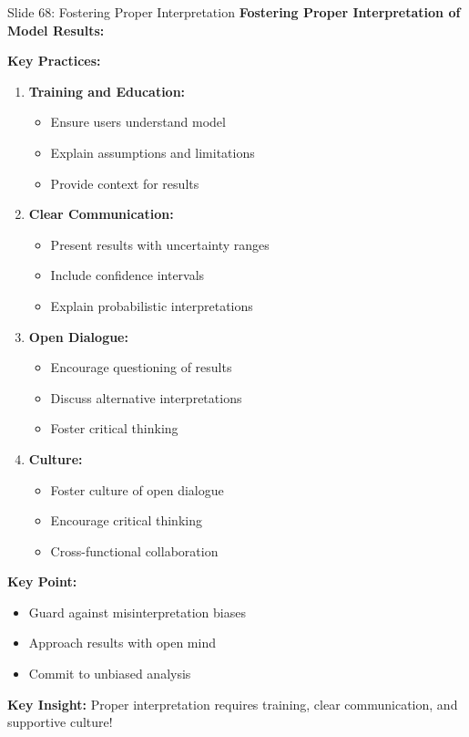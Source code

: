 \documentclass[8pt]{beamer}
\begin{document}
	\begin{frame}{Slide 68: Fostering Proper Interpretation}
		\fontsize{6.5}{7.5}\selectfont
		\textbf{Fostering Proper Interpretation of Model Results:}
		
		\vspace{0.1cm}
		\textbf{Key Practices:}
		\begin{enumerate}
			\item \textbf{Training and Education:}
			\begin{itemize}
				\item Ensure users understand model
				\item Explain assumptions and limitations
				\item Provide context for results
			\end{itemize}
			\item \textbf{Clear Communication:}
			\begin{itemize}
				\item Present results with uncertainty ranges
				\item Include confidence intervals
				\item Explain probabilistic interpretations
			\end{itemize}
			\item \textbf{Open Dialogue:}
			\begin{itemize}
				\item Encourage questioning of results
				\item Discuss alternative interpretations
				\item Foster critical thinking
			\end{itemize}
			\item \textbf{Culture:}
			\begin{itemize}
				\item Foster culture of open dialogue
				\item Encourage critical thinking
				\item Cross-functional collaboration
			\end{itemize}
		\end{enumerate}
		
		\vspace{0.1cm}
		\textbf{Key Point:}
		\begin{itemize}
			\item Guard against misinterpretation biases
			\item Approach results with open mind
			\item Commit to unbiased analysis
		\end{itemize}
		
		\textcolor{myblue}{\textbf{Key Insight:}} Proper interpretation requires \textcolor{myblue}{training, clear communication, and supportive culture}!
	\end{frame}
	
\end{document}
